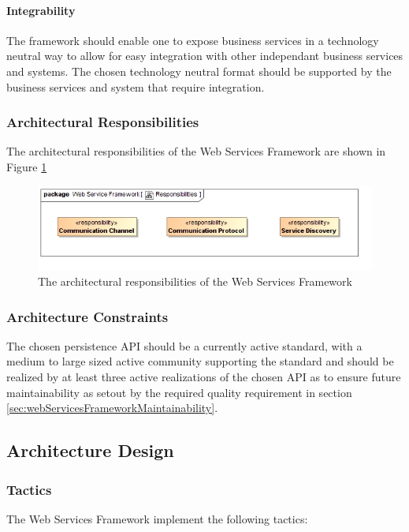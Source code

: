 \paragraph{Integrability}
The framework should enable one to expose business services in a technology
neutral way to allow for easy integration with other independant business
services and systems.  The chosen technology neutral format should be supported
by the business services and system that require integration.

\subsubsection{Architectural Responsibilities}
The architectural responsibilities of the Web Services Framework are shown in 
Figure \ref{fig:webServicesFrameworkResponsibilities}
\begin{figure}[H]
	\begin{center}
	\includegraphics[scale=0.5]{../Diagrams and Charts/Web Services Framework/Responsibilities.jpg}
	\caption{The architectural responsibilities of the Web Services Framework}
	\label{fig:webServicesFrameworkResponsibilities}
	\end{center}
\end{figure}

\subsubsection{Architecture Constraints}
The chosen persistence API should be a currently active standard, with a medium
to large sized active community supporting the standard and should be realized
by at least three active realizations of the chosen API as to ensure future 
maintainability as setout by the required quality requirement in 
section \ref{sec:webServicesFrameworkMaintainability}.

\subsection{Architecture Design}
\subsubsection{Tactics}
The Web Services Framework implement the following tactics:
